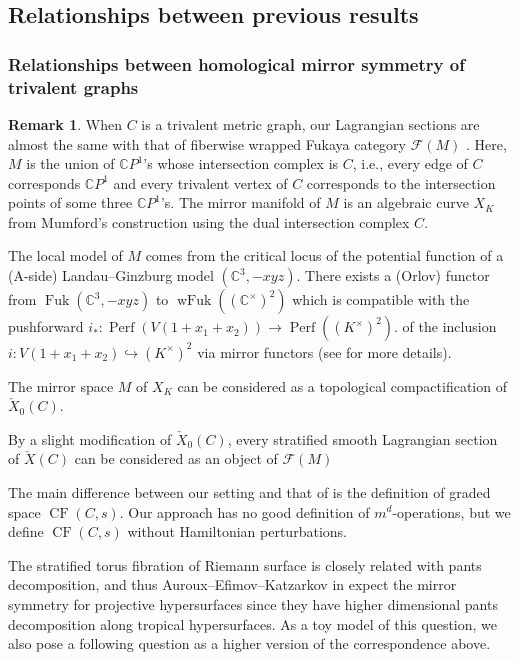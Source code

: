\documentclass[a4paper,dvipdfmx,reqno,12pt]{amsart}
\theoremstyle{definition}
\newtheorem{remark}[theorem]{Remark}
\newcommand{\C}{\mathbb{C}}%
\newcommand{\mcal}[1]{\mathcal{#1}}%
\newcommand{\opn}[1]{\operatorname{#1}}
\newcommand{\hookto}{\hookrightarrow}
\numberwithin{equation}{section}
\begin{document}
\subsection{Relationships between previous results}
\label{section-tropical-curve-note}


\subsubsection{Relationships between
homological mirror symmetry of trivalent graphs}
\label{section-syz-trivalent-graph}

\begin{remark} \label{rmk: curve_mirror}
When $C$ is a trivalent metric graph, 
our Lagrangian sections are 
almost the same with that of fiberwise wrapped Fukaya category 
$\mcal{F}(M)$ \cite[3.1]{auroux2022lagrangian}.
Here, $M$ is the
union of $\C P^{1}$'s whose intersection complex is $C$, 
i.e., every edge of $C$ corresponds
$\C P^{1}$ and every trivalent vertex of $C$ corresponds
to the intersection points of some three $\C P^{1}$'s.
The mirror manifold of $M$ is an algebraic curve $X_K$
from Mumford's construction using the dual intersection
complex $C$.

The local model of $M$ comes from the critical locus
of the potential function of a (A-side) Landau--Ginzburg 
model $(\C^{3},-xyz)$. There exists a (Orlov) functor
from $\opn{Fuk}(\C^{3},-xyz)$ 
to $\opn{wFuk}((\C^{\times})^2)$ which is compatible
with the pushforward 
$i_*\colon \opn{Perf}(V(1+x_1+x_2))\to \opn{Perf}((K^{\times})^{2})$. 
of the inclusion $i\colon V(1+x_1+x_2)\hookto (K^{\times})^2$
via mirror functors (see \cite[2.]{auroux2022lagrangian}
for more details). 

The mirror space $M$ of $X_K$ can be considered as a 
topological compactification of $\check{X}_0(C)$.

By a slight modification of $\check{X}_0(C)$, every 
stratified smooth Lagrangian section of $\check{X}(C)$ 
can be considered as an object of $\mcal{F}(M)$

The main difference between our setting and 
that of \cite{auroux2022lagrangian} 
is the definition of graded space $\opn{CF}(C,s)$. 
Our approach has no good definition 
of $m^{d}$-operations, but we define $\opn{CF}(C,s)$ 
without Hamiltonian
perturbations.
\end{remark}

The stratified torus fibration of Riemann surface is 
closely related with pants decomposition, and thus
Auroux--Efimov--Katzarkov in \cite{auroux2022lagrangian} expect the mirror symmetry 
for projective hypersurfaces since they have higher 
dimensional pants decomposition \cite{MR2079993} along
tropical hypersurfaces.
As a toy model of this question, we also pose a 
following question as a higher version of the 
correspondence above.
\end{document}
